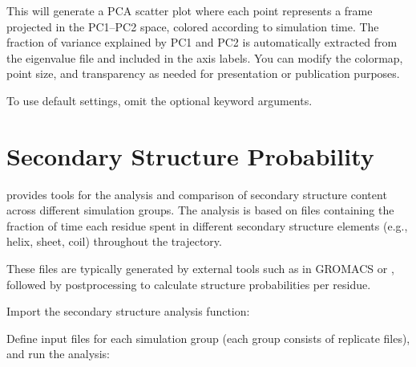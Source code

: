 \documentclass[a4paper,10pt,english]{sphinxmanual}
\begin{document}
\sphinxAtStartPar
This will generate a PCA scatter plot where each point represents a frame projected in the PC1–PC2 space, colored according to simulation time. The fraction of variance explained by PC1 and PC2 is automatically extracted from the eigenvalue file and included in the axis labels. You can modify the colormap, point size, and transparency as needed for presentation or publication purposes.

\sphinxAtStartPar
To use default settings, omit the optional keyword arguments.


\section{Secondary Structure Probability}
\label{\detokenize{Input:secondary-structure-probability}}
\sphinxAtStartPar
{} provides tools for the analysis and comparison of secondary structure content across different simulation groups. The analysis is based on  files containing the fraction of time each residue spent in different secondary structure elements (e.g., helix, sheet, coil) throughout the trajectory.

\sphinxAtStartPar
These  files are typically generated by external tools such as  in GROMACS or , followed by post\sphinxhyphen{}processing to calculate structure probabilities per residue.

\sphinxAtStartPar
{}

\sphinxAtStartPar
Import the secondary structure analysis function:

\begin{sphinxVerbatim}[commandchars=\\\{\}]
 
\end{sphinxVerbatim}

\sphinxAtStartPar
Define input files for each simulation group (each group consists of replicate  files), and run the analysis:
\end{document}
